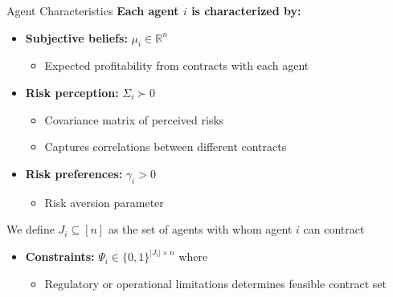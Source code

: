 \documentclass[aspectratio=169]{beamer}
\begin{document}
\begin{frame}{Agent Characteristics}
\textbf{Each agent $i$ is characterized by:}

\begin{itemize}
    \item \textbf{Subjective beliefs:} $\mu_i \in \mathbb{R}^n$
    \begin{itemize}
        \item Expected profitability from contracts with each agent
    \end{itemize}
    
    \item \textbf{Risk perception:} $\Sigma_i \succ 0$
    \begin{itemize}
        \item Covariance matrix of perceived risks
        \item Captures correlations between different contracts
    \end{itemize}
    
    \item \textbf{Risk preferences:} $\gamma_i > 0$
    \begin{itemize}
        \item Risk aversion parameter
    \end{itemize}
\end{itemize}

We define $J_i \subseteq [n]$ as the set of agents with whom agent $i$ can contract
\begin{itemize}
    \item \textbf{Constraints:} $\Psi_i \in \{0,1\}^{|J_i| \times n}$ where 
    \begin{itemize}
        \item Regulatory or operational limitations determines feasible contract set
    \end{itemize}
\end{itemize}
\end{frame}
\end{document}

